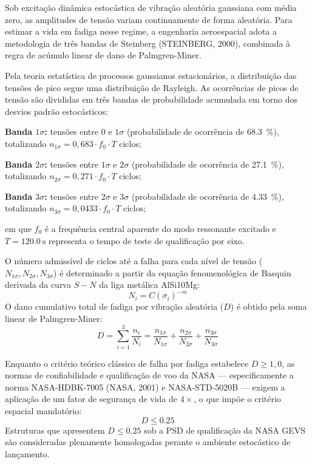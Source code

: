 Sob excitação dinâmica estocástica de vibração aleatória gaussiana com média zero, as amplitudes de tensão variam continuamente de forma aleatória. Para estimar a vida em fadiga nesse regime, a engenharia aeroespacial adota a metodologia de três bandas de Steinberg (STEINBERG, 2000), combinada à regra de acúmulo linear de dano de Palmgren-Miner.

Pela teoria estatística de processos gaussianos estacionários, a distribuição das tensões de pico segue uma distribuição de Rayleigh. As ocorrências de picos de tensão são divididas em três bandas de probabilidade acumulada em torno dos desvios padrão estocásticos:
\begin{alineas}
  \item \textbf{Banda $1\sigma$:} tensões entre $0$ e $1\sigma$ (probabilidade de ocorrência de \SI{68.3}{\percent}), totalizando $n_{1\sigma} = 0{,}683 \cdot f_0 \cdot T$ ciclos;
  \item \textbf{Banda $2\sigma$:} tensões entre $1\sigma$ e $2\sigma$ (probabilidade de ocorrência de \SI{27.1}{\percent}), totalizando $n_{2\sigma} = 0{,}271 \cdot f_0 \cdot T$ ciclos;
  \item \textbf{Banda $3\sigma$:} tensões entre $2\sigma$ e $3\sigma$ (probabilidade de ocorrência de \SI{4.33}{\percent}), totalizando $n_{3\sigma} = 0{,}0433 \cdot f_0 \cdot T$ ciclos;
\end{alineas}
em que $f_0$ é a frequência central aparente do modo ressonante excitado e $T = \SI{120.0}{\second}$ representa o tempo de teste de qualificação por eixo.

O número admissível de ciclos até a falha para cada nível de tensão ($N_{1\sigma}, N_{2\sigma}, N_{3\sigma}$) é determinado a partir da equação fenomenológica de Basquin derivada da curva $S-N$ da liga metálica AlSi10Mg:
\begin{equation}
  N_i = C \left( \sigma_i \right)^{-m}
  \label{eq:basquin-teoria}
\end{equation}
O dano cumulativo total de fadiga por vibração aleatória ($D$) é obtido pela soma linear de Palmgren-Miner:
\begin{equation}
  D = \sum_{i=1}^{3} \frac{n_i}{N_i} = \frac{n_{1\sigma}}{N_{1\sigma}} + \frac{n_{2\sigma}}{N_{2\sigma}} + \frac{n_{3\sigma}}{N_{3\sigma}}
  \label{eq:miner-teoria}
\end{equation}

Enquanto o critério teórico clássico de falha por fadiga estabelece $D \ge 1{,}0$, as normas de confiabilidade e qualificação de voo da NASA — especificamente a norma NASA-HDBK-7005 (NASA, 2001) e NASA-STD-5020B — exigem a aplicação de um fator de segurança de vida de $4\times$, o que impõe o critério espacial mandatório:
\begin{equation}
  D \le 0.25
  \label{eq:criterio-dano-nasa}
\end{equation}
Estruturas que apresentem $D \le \num{0.25}$ sob a PSD de qualificação da NASA GEVS são consideradas plenamente homologadas perante o ambiente estocástico de lançamento.

